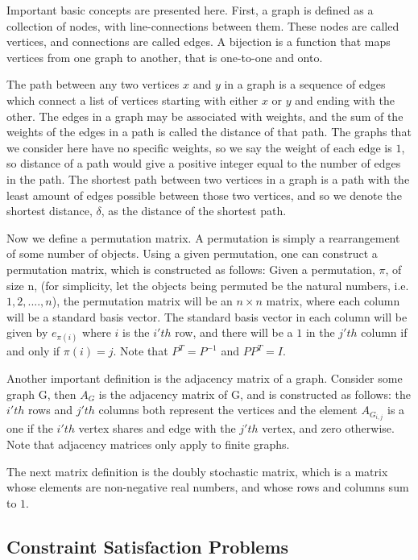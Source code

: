 \documentclass[12pt]{article}
\begin{document}
Important basic concepts are presented here. First, a graph is defined
as a collection of nodes, with line-connections between them. These
nodes are called vertices, and connections are called edges. A
bijection is a function that maps vertices from one graph to another,
that is one-to-one and onto.

The path between any two vertices $x$ and $y$ in a graph is a sequence
of edges which connect a list of vertices starting with either $x$ or
$y$ and ending with the other. The edges in a graph may be associated
with weights, and the sum of the weights of the edges in a path is
called the distance of that path. The graphs that we consider here
have no specific weights, so we say the weight of each edge is $1$, so
distance of a path would give a positive integer equal to the number
of edges in the path. The shortest path between two vertices in a
graph is a path with the least amount of edges possible between those
two vertices, and so we denote the shortest distance, $\delta$, as the
distance of the shortest path.

Now we define a permutation matrix. A permutation is simply a
rearrangement of some number of objects. Using a given permutation,
one can construct a permutation matrix, which is constructed as
follows: Given a permutation, $\pi$, of size n, (for simplicity, let
the objects being permuted be the natural numbers, i.e. $1, 2, ....,
n$), the permutation matrix will be an $n \times n$ matrix, where each
column will be a standard basis vector. The standard basis vector in
each column will be given by $e_{\pi(i)}$ where $i$ is the $i'th$ row,
and there will be a $1$ in the $j'th$ column if and only if $\pi(i) =
j$. Note that $P^T = P^{-1}$ and $PP^T = I$.

Another important definition is the adjacency matrix of a
graph. Consider some graph G, then $A_G$ is the adjacency matrix of G,
and is constructed as follows: the $i'th$ rows and $j'th$ columns both
represent the vertices and the element $A_{G_{i, j}}$ is a one if the
$i'th$ vertex shares and edge with the $j'th$ vertex, and zero
otherwise. Note that adjacency matrices only apply to finite graphs.

The next matrix definition is the \hypertarget{stochastic}{doubly
  stochastic matrix}, which is a matrix whose elements are
non-negative real numbers, and whose rows and columns sum to $1$.

\subsection{Constraint Satisfaction Problems}
\label{ssec:csp}
\end{document}
